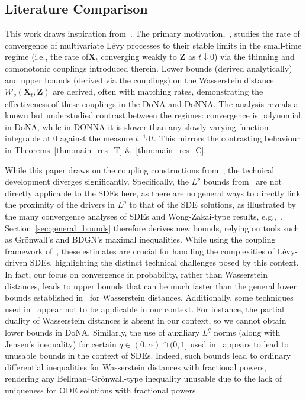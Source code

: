 \documentclass[en,oneside,bbfont,article]{amsart}
\theoremstyle{remark}
\theoremstyle{definition}
\theoremstyle{definition}
\newcommand{\mW}{\mathcal{W}}
\newcommand\1{\mathds{1}}
\newcommand{\D}{\mathrm{d}}
\begin{document}
\subsection{Literature Comparison}
\label{subsec:literature}

This work draws inspiration from~\cite{MR3784492,WassersteinPaper,deng2024optimalwasserstein1distancesdes,MR3332269,deng2024totalvariationdistancesdes}. The primary motivation,~\cite{WassersteinPaper}, studies the rate of convergence of multivariate Lévy processes to their stable limits in the small-time regime (i.e., the rate of$\bm{X}_t$ converging weakly to $\bm{Z}$ as $t \downarrow 0$) via the thinning and comonotonic couplings introduced therein. Lower bounds (derived analytically) and upper bounds (derived via the couplings) on the Wasserstein distance $\mW_q(\bm{X}_t,\bm{Z})$ are derived, often with matching rates, demonstrating the effectiveness of these couplings in the DoNA and DoNNA. The analysis reveals a known but understudied contrast between the regimes: convergence is polynomial in DoNA, while in DONNA it is slower than any slowly varying function integrable at $0$ against the measure $t^{-1}\D t$. This mirrors the contrasting behaviour in Theorems~\ref{thm:main_res_T} \&~\ref{thm:main_res_C}.

While this paper draws on the coupling constructions from~\cite{WassersteinPaper}, the technical development diverges significantly. Specifically, the $L^p$ bounds from~\cite[Sec.~3]{WassersteinPaper} are not directly applicable to the SDEs here, as there are no general ways to directly link the proximity of the drivers in $L^p$ to that of the SDE solutions, as illustrated by the many convergence analyses of SDEs and Wong-Zakai-type results, e.g.,~\cite{kosenkova2020orderconvergenceweakwongzakai,pavlyukevich2025stronguniformwongzakaiapproximations,MR3332269,MR2759203,deng2024optimalwasserstein1distancesdes}. Section~\ref{sec:general_bounds} therefore derives new bounds, relying on tools such as Gr\"onwall's and BDGN's maximal inequalities. While using the coupling framework of~\cite{WassersteinPaper}, these estimates are crucial for handling the complexities of L\'evy-driven SDEs, highlighting the distinct technical challenges posed by this context. In fact, our focus on convergence in probability, rather than Wasserstein distances, leads to upper bounds that can be much faster than the general lower bounds established in~\cite{WassersteinPaper} for Wasserstein distances. Additionally, some techniques used in~\cite{WassersteinPaper} appear not to be applicable in our context. For instance, the partial duality of Wasserstein distances is absent in our context, so we cannot obtain lower bounds in DoNA. Similarly, the use of auxiliary $L^q$ norms (along with Jensen's inequality) for certain $q\in(0,\alpha)\cap(0,1]$ used in~\cite{WassersteinPaper} appears to lead to unusable bounds in the context of SDEs. Indeed, such bounds lead to ordinary differential inequalities for Wasserstein distances with fractional powers, rendering any Bellman--Gr\"onwall-type inequality unusable due to the lack of uniqueness for ODE solutions with fractional powers.
\end{document}
